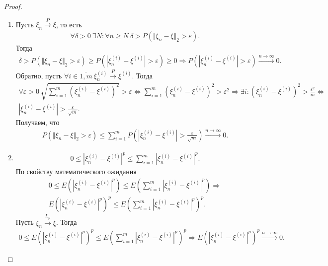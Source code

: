 \begin{proof}
\begin{enumerate}
		\item Пусть $\xi _{n}\xrightarrow{P} \xi$, то есть
		\begin{gather*}
		    \displaystyle \forall \delta  >0\ \exists N:\forall n\geqslant N\ \delta  >P(\Vert \xi _{n} -\xi \Vert _{2}  >\varepsilon ).
		\end{gather*}
		Тогда
		\begin{gather*}
		    \delta  >P(\Vert \xi _{n} -\xi \Vert _{2}  >\varepsilon ) \geqslant P\left(\left| \xi _{n}^{( i)} -\xi ^{( i)}\right|  >\varepsilon \right) \geqslant 0\Rightarrow P\left(\left| \xi _{n}^{( i)} -\xi ^{( i)}\right|  >\varepsilon \right)\xrightarrow{n\rightarrow \infty } 0.
		\end{gather*}
		Обратно, пусть $\forall i\in \overline{1,m} \ \xi _{n}^{( i)}\xrightarrow{P} \xi ^{( i)}$. Тогда
		\begin{gather*}
		    \forall \varepsilon  >0\ \sqrt{\sum _{i=1}^{m}\left( \xi _{n}^{( i)} -\xi ^{( i)}\right)^{2}}  >\varepsilon \Leftrightarrow \sum _{i=1}^{m}\left( \xi _{n}^{( i)} -\xi ^{( i)}\right)^{2}  >\varepsilon ^{2} \Rightarrow \exists i:\left( \xi _{n}^{( i)} -\xi ^{( i)}\right)^{2}  >\frac{\varepsilon ^{2}}{m} \Leftrightarrow\\ \left| \xi _{n}^{( i)} -\xi ^{( i)}\right|  >\frac{\varepsilon }{\sqrt{m}}.
		\end{gather*}
		Получаем, что
		\begin{gather*}
		    P\left(\Vert \xi_n - \xi \Vert_2 > \varepsilon\right) \le \sum_{i=1}^m P\left(\left|\xi_n^{(i)} - \xi^{(i)}\right| > \frac{\varepsilon}{\sqrt{m}}\right) \xrightarrow{n\rightarrow\infty} 0.
		\end{gather*}
		
		\item
		\begin{gather*}
		    0\leqslant \left| \xi _{n}^{( i)} -\xi ^{( i)}\right| ^{p} \leqslant \sum _{i=1}^{m}\left| \xi _{n}^{( i)} -\xi ^{( i)}\right| ^{p}.
		\end{gather*}
		По свойству математического ожидания
		\begin{gather*}
		    0\leqslant E\left(\left| \xi _{n}^{( i)} -\xi ^{( i)}\right| ^{p}\right) \leqslant E\left(\sum _{i=1}^{m}\left| \xi _{n}^{( i)} -\xi ^{( i)}\right| ^{p}\right) \Rightarrow\\  E\left(\left|\xi_n^{(i)} - \xi^{(i)}\right|^p\right)^p \le E\left(\sum _{i=1}^{m}\left| \xi _{n}^{( i)} -\xi ^{( i)}\right| ^{p}\right)^p.
		\end{gather*}
		Пусть $\xi _{n}\xrightarrow{L_{p}} \xi$. Тогда
		\begin{gather*}
		    0 \le E\left(\left|\xi_n^{(i)} - \xi^{(i)}\right|^p\right)^p \le E\left(\sum _{i=1}^{m}\left| \xi _{n}^{( i)} -\xi ^{( i)}\right| ^{p}\right)^p \Rightarrow E\left(\left|\xi_n^{(i)} - \xi^{(i)}\right|^p\right)^p \xrightarrow{n\rightarrow\infty}0.
		\end{gather*}
		

\end{enumerate}
\end{proof}
